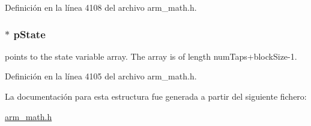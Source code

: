Definición en la línea 4108 del archivo arm\+\_\+math.\+h.

\subsubsection[{\texorpdfstring{p\+State}{pState}}]{$\ast$ p\+State}\hypertarget{structarm__lms__instance__q31_adee4ba3ee8869865af7d8fa08ca913d6}{}\label{structarm__lms__instance__q31_adee4ba3ee8869865af7d8fa08ca913d6}
points to the state variable array. The array is of length num\+Taps+block\+Size-\/1. 

Definición en la línea 4105 del archivo arm\+\_\+math.\+h.



La documentación para esta estructura fue generada a partir del siguiente fichero\+:\begin{DoxyCompactItemize}
\item 
\hyperlink{arm__math_8h}{arm\+\_\+math.\+h}\end{DoxyCompactItemize}
